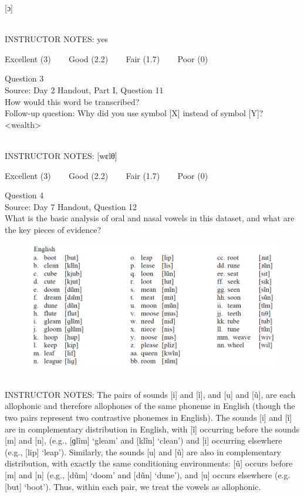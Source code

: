 \documentclass[12pt]{article}
\begin{document}
{[ɔ]}


~\\
INSTRUCTOR NOTES: yes


\vfill
Excellent (3) ~~~ Good (2.2) ~~~ Fair (1.7) ~~~ Poor (0)
\newpage

{\large Question 3}\\

Source: Day 2 Handout, Part I, Question 11\\

How would this word be transcribed?\\ Follow-up question: Why did you use symbol [X] instead of symbol [Y]?\\

<wealth>


~\\
INSTRUCTOR NOTES: [wɛlθ]


\vfill
Excellent (3) ~~~ Good (2.2) ~~~ Fair (1.7) ~~~ Poor (0)
\newpage

{\large Question 4}\\

Source: Day 7 Handout, Question 12\\

What is the basic analysis of oral and nasal vowels in this dataset, and what are the key pieces of evidence?\\

\begin{figure}[H]
\includegraphics{../images/english12.png}
\end{figure}

~\\
INSTRUCTOR NOTES: The pairs of sounds [i] and [ĩ], and [u] and [ũ], are each allophonic and therefore allophones of the same phoneme in English (though the two pairs represent two contrastive phonemes in English). The sounds [i] and [ĩ] are in complementary distribution in English, with [ĩ] occurring before the sounds [m] and [n], (e.g., [ɡlĩm] ‘gleam’ and [klĩn] ‘clean’) and [i] occurring elsewhere (e.g., [lip] ‘leap’). Similarly, the sounds [u] and [ũ] are also in complementary distribution, with exactly the same conditioning environments: [ũ] occurs before [m] and [n] (e.g., [dũm] ‘doom’ and [dũn] ‘dune’), and [u] occurs elsewhere (e.g. [but] ‘boot’). Thus, within each pair, we treat the vowels as allophonic. 
\end{document}
